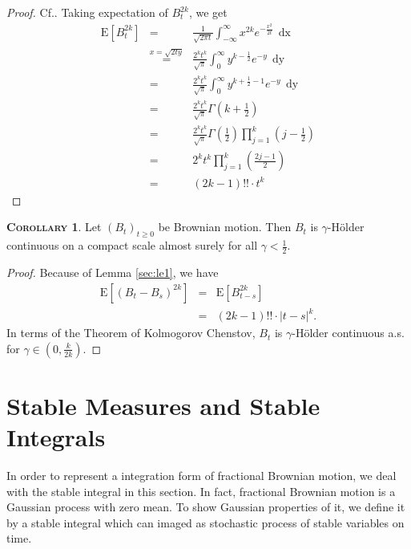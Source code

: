\documentclass[a4paper, twoside, 11pt]{article}
\theoremstyle{definition}
\newtheorem{corollary}[definition]{\scshape Corollary}
\begin{document}
\begin{proof}
  Cf.\cite{shilling}. Taking expectation of $B_t^{2k}$, we get
  \begin{eqnarray*}
	\mathrm{E}[B_t^{2k}] &=& \frac{1}{\sqrt{2\pi t}}\int_{-\infty}^{\infty} x^{2k} e^{-\frac{x^2}{2t}}\,\mathop{dx}\\
	&\overset{x=\sqrt{2ty}}{=}& \frac{2^kt^k}{\sqrt{\pi}} \int_0^{\infty} y^{k-\frac{1}{2}} e^{-y}\,\mathop{dy}\\
	&=& \frac{2^kt^k}{\sqrt{\pi}} \int_0^{\infty} y^{k+\frac{1}{2}-1} e^{-y}\,\mathop{dy}\\
	&=& \frac{2^kt^k}{\sqrt{\pi}} \Gamma(k + \frac{1}{2})\\
	&=& \frac{2^kt^k}{\sqrt{\pi}} \Gamma(\frac{1}{2})\prod_{j=1}^k(j-\frac{1}{2}) \\
	&=& 2^k t^k\prod_{j=1}^k(\frac{2j-1}{2}) \\
	&=& (2k - 1)!!\cdot t^k
  \end{eqnarray*}
\end{proof}

\begin{corollary}
  Let $(B_t)_{t\ge 0}$ be Brownian motion. Then $B_t$ is $\gamma$-H\"older continuous on a compact scale almost surely for all $\gamma < \frac{1}{2}$.
\end{corollary}

\begin{proof}
  Because of Lemma \ref{sec:le1}, we have
  \begin{eqnarray*}
	\mathrm{E}[(B_t-B_s)^{2k}] &=& \mathrm{E}[B_{t-s}^{2k}]\\
	&=& (2k - 1)!! \cdot |t-s|^{k}.
  \end{eqnarray*}
  In terms of the Theorem of Kolmogorov Chenstov, $B_t$ is $\gamma$-H\"older continuous a.s. for $\gamma \in (0, \frac{k}{2k})$.
\end{proof}

\newpage

\section{Stable Measures and Stable Integrals}
\setcounter{equation}{0}
In order to represent a integration form of fractional Brownian motion, we deal with the stable integral in this section. In fact, fractional Brownian motion is a Gaussian process with zero mean. To show Gaussian properties of it, we define it by a 
stable integral which can imaged as stochastic process of stable variables on time.
\end{document}
